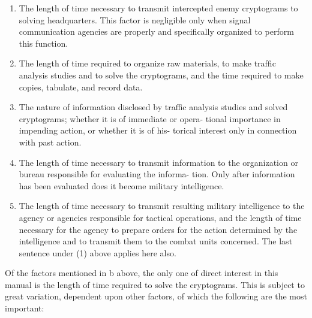 \begin{enumerate}
\item The length of time necessary to transmit intercepted enemy
cryptograms to solving headquarters. This factor is negligible
only when signal communication agencies are properly and
speciﬁcally organized to perform this function.

\item The length of time required to organize raw materials, to make
trafﬁc analysis studies and to solve the cryptograms, and the
time required to make copies, tabulate, and record data.

\item The nature of information disclosed by traffic analysis studies
and solved cryptograms; whether it is of immediate or opera-
tional importance in impending action, or whether it is of his-
torical interest only in connection with past action.

\item The length of time necessary to transmit information to the
organization or bureau responsible for evaluating the informa-
tion. Only after information has been evaluated does it become
military intelligence.

\item The length of time necessary to transmit resulting military
intelligence to the agency or agencies responsible for tactical
operations, and the length of time necessary for the agency to
prepare orders for the action determined by the intelligence and
to transmit them to the combat units concerned. The last
sentence under (1) above applies here also.
\end{enumerate}

\mypara Of the factors mentioned in b above, the only one of direct interest
in this manual is the length of time required to solve the cryptograms.
This is subject to great variation, dependent upon other factors, of
which the following are the most important:


